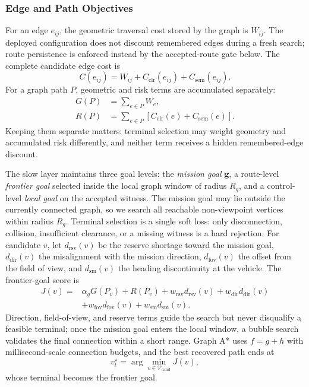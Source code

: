 \documentclass[letterpaper,10pt,conference]{ieeeconf}
\newcommand{\vect}[1]{\boldsymbol{#1}}
\begin{document}
\subsubsection{Edge and Path Objectives}
For an edge $e_{ij}$, the geometric traversal cost stored by the graph is
$W_{ij}$.  The deployed configuration does not discount remembered edges
during a fresh search; route persistence is enforced instead by the
accepted-route gate below.  The complete candidate edge cost is
\begin{equation}
 C(e_{ij})=W_{ij}+C_{\mathrm{clr}}(e_{ij})+C_{\mathrm{sem}}(e_{ij}).
\label{eq:edge_cost}
\end{equation}
For a graph path $P$, geometric and risk terms are accumulated separately:
\begin{align}
 G(P)&=\sum_{e\in P}W_e,\\
 R(P)&=\sum_{e\in P}
       \left[C_{\mathrm{clr}}(e)+C_{\mathrm{sem}}(e)\right].
\end{align}
Keeping them separate matters: terminal selection may weight geometry and
accumulated risk differently, and neither term receives a hidden
remembered-edge discount.

The slow layer maintains three goal levels: the \emph{mission goal}
$\vect{g}$, a route-level \emph{frontier goal} selected inside the local
graph window of radius $R_g$, and a control-level \emph{local goal} on the
accepted witness.  The mission goal may lie outside the currently connected
graph, so we search all reachable non-viewpoint vertices within radius
$R_g$.  Terminal selection is a single soft loss: only disconnection,
collision, insufficient clearance, or a missing witness is a hard rejection.
For candidate $v$, let $d_{\mathrm{rsv}}(v)$ be the reserve shortage toward
the mission goal, $d_{\mathrm{dir}}(v)$ the misalignment with the mission
direction, $d_{\mathrm{fov}}(v)$ the offset from the field of view, and
$d_{\mathrm{sm}}(v)$ the heading discontinuity at the vehicle.  The
frontier-goal score is
\begin{align}
 J(v)={}&\alpha_gG(P_v)+R(P_v)
       +w_{\mathrm{rsv}}d_{\mathrm{rsv}}(v)+w_{\mathrm{dir}}d_{\mathrm{dir}}(v)
       \nonumber\\
       &+w_{\mathrm{fov}}d_{\mathrm{fov}}(v)
       +w_{\mathrm{sm}}d_{\mathrm{sm}}(v).
\label{eq:terminal}
\end{align}
Direction, field-of-view, and reserve terms guide the search but never
disqualify a feasible terminal; once the mission goal enters the local
window, a bubble search validates the final connection within a short range.
Graph A* uses $f=g+h$ with millisecond-scale connection budgets, and the best
recovered path ends at
\begin{equation}
 v_t^\star=\arg\min_{v\in\mathcal{V}_{\mathrm{cand}}}J(v),
\end{equation}
whose terminal becomes the frontier goal.
\end{document}

